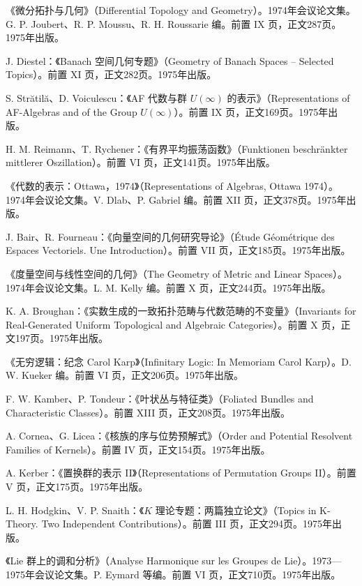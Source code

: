 \begin{description}[style=nextline,leftmargin=1.5em,itemsep=7pt]
\item[第484卷]《微分拓扑与几何》（Differential Topology and Geometry）。1974年会议论文集。G. P. Joubert、R. P. Moussu、R. H. Roussarie 编。前置 IX 页，正文287页。1975年出版。
\item[第485卷] J. Diestel：《Banach 空间几何专题》（Geometry of Banach Spaces -- Selected Topics）。前置 XI 页，正文282页。1975年出版。
\item[第486卷] S. Strătilă、D. Voiculescu：《AF 代数与群 $U(\infty)$ 的表示》（Representations of AF-Algebras and of the Group $U(\infty)$）。前置 IX 页，正文169页。1975年出版。
\item[第487卷] H. M. Reimann、T. Rychener：《有界平均振荡函数》（Funktionen beschränkter mittlerer Oszillation）。前置 VI 页，正文141页。1975年出版。
\item[第488卷]《代数的表示：Ottawa，1974》（Representations of Algebras, Ottawa 1974）。1974年会议论文集。V. Dlab、P. Gabriel 编。前置 XII 页，正文378页。1975年出版。
\item[第489卷] J. Bair、R. Fourneau：《向量空间的几何研究导论》（Étude Géométrique des Espaces Vectoriels. Une Introduction）。前置 VII 页，正文185页。1975年出版。
\item[第490卷]《度量空间与线性空间的几何》（The Geometry of Metric and Linear Spaces）。1974年会议论文集。L. M. Kelly 编。前置 X 页，正文244页。1975年出版。
\item[第491卷] K. A. Broughan：《实数生成的一致拓扑范畴与代数范畴的不变量》（Invariants for Real-Generated Uniform Topological and Algebraic Categories）。前置 X 页，正文197页。1975年出版。
\item[第492卷]《无穷逻辑：纪念 Carol Karp》（Infinitary Logic: In Memoriam Carol Karp）。D. W. Kueker 编。前置 VI 页，正文206页。1975年出版。
\item[第493卷] F. W. Kamber、P. Tondeur：《叶状丛与特征类》（Foliated Bundles and Characteristic Classes）。前置 XIII 页，正文208页。1975年出版。
\item[第494卷] A. Cornea、G. Licea：《核族的序与位势预解式》（Order and Potential Resolvent Families of Kernels）。前置 IV 页，正文154页。1975年出版。
\item[第495卷] A. Kerber：《置换群的表示 II》（Representations of Permutation Groups II）。前置 V 页，正文175页。1975年出版。
\item[第496卷] L. H. Hodgkin、V. P. Snaith：《$K$ 理论专题：两篇独立论文》（Topics in K-Theory. Two Independent Contributions）。前置 III 页，正文294页。1975年出版。
\item[第497卷]《Lie 群上的调和分析》（Analyse Harmonique sur les Groupes de Lie）。1973—1975年会议论文集。P. Eymard 等编。前置 VI 页，正文710页。1975年出版。

\end{description}
